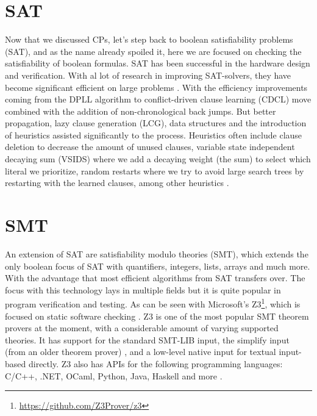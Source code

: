 \section{SAT}
\label{CS:SAT}
Now that we discussed CPs, let's step back to boolean satisfiability problems (SAT), and as the name already spoiled it, here we are focused on checking the satisfiability of boolean formulas. SAT has been successful in the hardware design and verification. With al lot of research in improving SAT-solvers, they have become significant efficient on large problems \cite{56bardin2019bringing}.
With the efficiency improvements coming from the DPLL algorithm to conflict-driven clause learning (CDCL) move combined with the addition of non-chronological back jumps. But better propagation, lazy clause generation (LCG), data structures and the introduction of heuristics assisted significantly to the process. Heuristics often include clause deletion to decrease the amount of unused clauses, variable state independent decaying sum (VSIDS) where we add a decaying weight (the sum) to select which literal we prioritize, random restarts where we try to avoid large search trees by restarting with the learned clauses, among other heuristics \cite{61MCSMarcDenecker, 60katebi2011empirical, 67stuckey2010lazyClauseGeneration}.



\section{SMT}
\label{CS:SMT}
An extension of SAT are satisfiability modulo theories (SMT), which extends the only boolean focus of SAT with quantifiers, integers, lists, arrays and much more. With the advantage that most efficient algorithms from SAT transfers over. The focus with this technology lays in multiple fields but it is quite popular in program verification and testing. As can be seen with Microsoft's Z3\footnote{\url{https://github.com/Z3Prover/z3}}, which is focused on static software checking \cite{54moura2008z3}. Z3 is one of the most popular SMT theorem provers at the moment, with a considerable amount of varying supported theories. It has support for the standard SMT-LIB input, the simplify input (from an older theorem prover) \cite{73detlefs2005simplify}, and a low-level native input for textual input-based directly. Z3 also has APIs for the following programming languages: C/C++, .NET, OCaml, Python, Java, Haskell and more \cite{64WikiSMT}.

